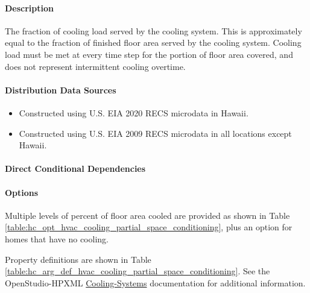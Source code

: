 \paragraph{Description}
% 
The fraction of cooling load served by the cooling system. This is approximately equal to the fraction of finished floor area served by the cooling system. Cooling load must be met at every time step for the portion of floor area covered, and does not represent intermittent cooling overtime. 

\paragraph{Distribution Data Sources}
% 
\begin{itemize}
\item Constructed using U.S. EIA 2020 RECS microdata in Hawaii.
\item Constructed using U.S. EIA 2009 RECS microdata in all locations except Hawaii.
\end{itemize}

\paragraph{Direct Conditional Dependencies}


\paragraph{Options}
Multiple levels of percent of floor area cooled are provided as shown in Table \ref{table:hc_opt_hvac_cooling_partial_space_conditioning}, plus an option for homes that have no cooling.



Property definitions are shown in Table \ref{table:hc_arg_def_hvac_cooling_partial_space_conditioning}. See the OpenStudio-HPXML \href{https://openstudio-hpxml.readthedocs.io/en/v1.10.0/workflow_inputs.html#hpxml-cooling-systems}{Cooling-Systems} documentation for additional information.



